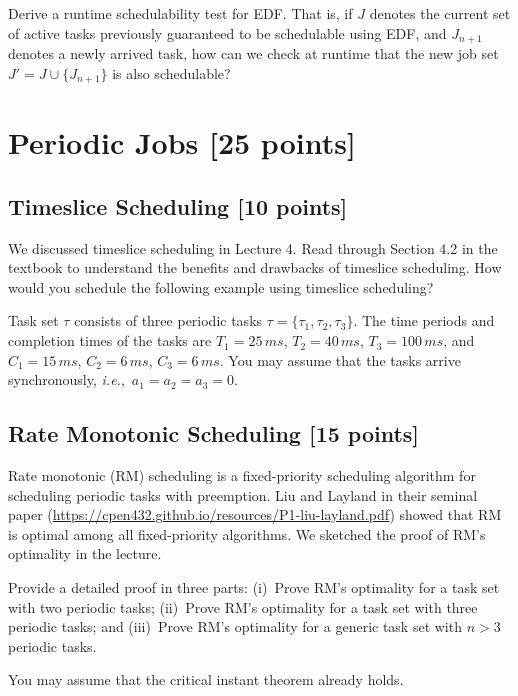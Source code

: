 \documentclass[12pt]{article}
\newcommand{\ie}{{\textit{i.e.}}}
\begin{document}
Derive a runtime schedulability test for EDF. That is, if $J$ denotes the
current set of active tasks previously guaranteed to be schedulable using EDF,
and $J_{n+1}$ denotes a newly arrived task, how can we check at runtime that
the new job set $J' = J \cup \{J_{n+1}\}$ is also schedulable?

\section{Periodic Jobs [25 points]}

\subsection{Timeslice Scheduling [10 points]}

We discussed timeslice scheduling in Lecture 4. Read through Section 4.2 in the
textbook to understand the benefits and drawbacks of timeslice scheduling. How
would you schedule the following example using timeslice scheduling?

Task set $\tau$ consists of three periodic tasks $\tau = \{\tau_1, \tau_2,
\tau_3\}$. The time periods and completion times of the tasks are $T_1 =
25\,ms$, $T_2 = 40\,ms$, $T_3 = 100\,ms$, and $C_1 = 15\,ms$, $C_2=6\,ms$,
$C_3=6\,ms$. You may assume that the tasks arrive synchronously, \ie,~$a_1 =
a_2 = a_3 = 0$.

\subsection{Rate Monotonic Scheduling [15 points]}

Rate monotonic (RM) scheduling is a fixed-priority scheduling algorithm for
scheduling periodic tasks with preemption. Liu and Layland in their seminal
paper (\url{https://cpen432.github.io/resources/P1-liu-layland.pdf}) showed
that RM is optimal among all fixed-priority algorithms. We sketched the proof
of RM's optimality in the lecture.

Provide a detailed proof in three parts: (i)~Prove RM's optimality for a task
set with two periodic tasks; (ii)~Prove RM's optimality for a task set with
three periodic tasks; and (iii)~Prove RM's optimality for a generic task set
with $n > 3$ periodic tasks.

You may assume that the critical instant theorem already holds.
\end{document}
